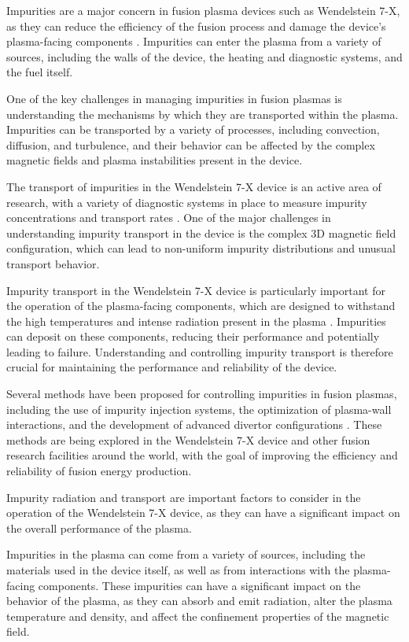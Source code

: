 \documentclass[12pt]{article}
\begin{document}
Impurities are a major concern in fusion plasma devices such as Wendelstein 7-X, as they can reduce the efficiency of the fusion process and damage the device's plasma-facing components \cite{w7x-impurities}. Impurities can enter the plasma from a variety of sources, including the walls of the device, the heating and diagnostic systems, and the fuel itself.

One of the key challenges in managing impurities in fusion plasmas is understanding the mechanisms by which they are transported within the plasma. Impurities can be transported by a variety of processes, including convection, diffusion, and turbulence, and their behavior can be affected by the complex magnetic fields and plasma instabilities present in the device.

The transport of impurities in the Wendelstein 7-X device is an active area of research, with a variety of diagnostic systems in place to measure impurity concentrations and transport rates \cite{w7x-impurity-transport}. One of the major challenges in understanding impurity transport in the device is the complex 3D magnetic field configuration, which can lead to non-uniform impurity distributions and unusual transport behavior.

Impurity transport in the Wendelstein 7-X device is particularly important for the operation of the plasma-facing components, which are designed to withstand the high temperatures and intense radiation present in the plasma \cite{w7x-plasma-facing-components}. Impurities can deposit on these components, reducing their performance and potentially leading to failure. Understanding and controlling impurity transport is therefore crucial for maintaining the performance and reliability of the device.

Several methods have been proposed for controlling impurities in fusion plasmas, including the use of impurity injection systems, the optimization of plasma-wall interactions, and the development of advanced divertor configurations \cite{w7x-impurity-control}. These methods are being explored in the Wendelstein 7-X device and other fusion research facilities around the world, with the goal of improving the efficiency and reliability of fusion energy production.

Impurity radiation and transport are important factors to consider in the operation of the Wendelstein 7-X device, as they can have a significant impact on the overall performance of the plasma.

Impurities in the plasma can come from a variety of sources, including the materials used in the device itself, as well as from interactions with the plasma-facing components. These impurities can have a significant impact on the behavior of the plasma, as they can absorb and emit radiation, alter the plasma temperature and density, and affect the confinement properties of the magnetic field.
\end{document}
